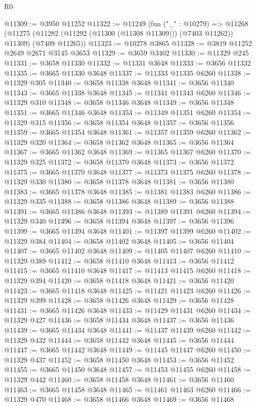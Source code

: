 \begin{lexlean}{R0}
\begin{coremodule}
@11309 := @3950 @11252
@11322 := @11249
    (fun ("_" : @10279) =>
    @11268 (@11275 (@11282 (@11292 (@11300 (@11308 @11309))) (@7403 @11262)) @11309) (@7409 @11265))
@11323 := @10278 @3865
@11328 := @3819 @11252 @2649 @2671 @3145 @3653
@11329 := @3659 @3402
@11330 := @11329 @245
@11331 := @3658 @11330
@11332 := @11331 @3648
@11333 := @3656 @11332
@11335 := @3665 @11330 @3648
@11337 := @11333 @11335 @6260
@11338 := @11329 @305
@11340 := @3658 @11338 @3648
@11341 := @3656 @11340
@11343 := @3665 @11338 @3648
@11345 := @11341 @11343 @6260
@11346 := @11329 @310
@11348 := @3658 @11346 @3648
@11349 := @3656 @11348
@11351 := @3665 @11346 @3648
@11353 := @11349 @11351 @6260
@11354 := @11329 @315
@11356 := @3658 @11354 @3648
@11357 := @3656 @11356
@11359 := @3665 @11354 @3648
@11361 := @11357 @11359 @6260
@11362 := @11329 @320
@11364 := @3658 @11362 @3648
@11365 := @3656 @11364
@11367 := @3665 @11362 @3648
@11369 := @11365 @11367 @6260
@11370 := @11329 @325
@11372 := @3658 @11370 @3648
@11373 := @3656 @11372
@11375 := @3665 @11370 @3648
@11377 := @11373 @11375 @6260
@11378 := @11329 @330
@11380 := @3658 @11378 @3648
@11381 := @3656 @11380
@11383 := @3665 @11378 @3648
@11385 := @11381 @11383 @6260
@11386 := @11329 @335
@11388 := @3658 @11386 @3648
@11389 := @3656 @11388
@11391 := @3665 @11386 @3648
@11393 := @11389 @11391 @6260
@11394 := @11329 @340
@11396 := @3658 @11394 @3648
@11397 := @3656 @11396
@11399 := @3665 @11394 @3648
@11401 := @11397 @11399 @6260
@11402 := @11329 @384
@11404 := @3658 @11402 @3648
@11405 := @3656 @11404
@11407 := @3665 @11402 @3648
@11409 := @11405 @11407 @6260
@11410 := @11329 @389
@11412 := @3658 @11410 @3648
@11413 := @3656 @11412
@11415 := @3665 @11410 @3648
@11417 := @11413 @11415 @6260
@11418 := @11329 @394
@11420 := @3658 @11418 @3648
@11421 := @3656 @11420
@11423 := @3665 @11418 @3648
@11425 := @11421 @11423 @6260
@11426 := @11329 @399
@11428 := @3658 @11426 @3648
@11429 := @3656 @11428
@11431 := @3665 @11426 @3648
@11433 := @11429 @11431 @6260
@11434 := @11329 @427
@11436 := @3658 @11434 @3648
@11437 := @3656 @11436
@11439 := @3665 @11434 @3648
@11441 := @11437 @11439 @6260
@11442 := @11329 @432
@11444 := @3658 @11442 @3648
@11445 := @3656 @11444
@11447 := @3665 @11442 @3648
@11449 := @11445 @11447 @6260
@11450 := @11329 @437
@11452 := @3658 @11450 @3648
@11453 := @3656 @11452
@11455 := @3665 @11450 @3648
@11457 := @11453 @11455 @6260
@11458 := @11329 @442
@11460 := @3658 @11458 @3648
@11461 := @3656 @11460
@11463 := @3665 @11458 @3648
@11465 := @11461 @11463 @6260
@11466 := @11329 @470
@11468 := @3658 @11466 @3648
@11469 := @3656 @11468

\end{coremodule}
\end{lexlean}
